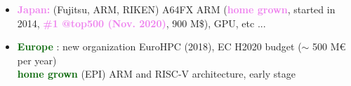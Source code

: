 \begin{frame}
\begin{itemize}
  \item \textcolor{violet}{\bf \large Japan:} (Fujitsu, ARM, RIKEN)  A64FX ARM (\textcolor{violet}{\bf home grown}, started in 2014, \textcolor{violet}{\bf \#1 @top500 (Nov. 2020)}, 900 M\$), GPU, etc ...
  \item \textcolor{darkgreen}{\bf \large Europe} : new organization EuroHPC (2018), EC H2020 budget ($\sim$ 500 M\euro{} per year)\\
    \textcolor{darkgreen}{\bf home grown} (EPI) ARM and RISC-V architecture, early stage%
  \end{itemize}


\end{frame}

